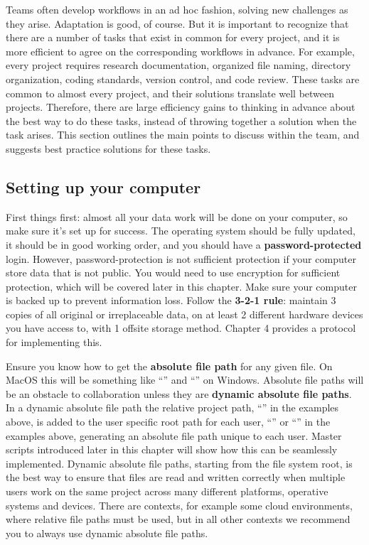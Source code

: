 Teams often develop workflows in an ad hoc fashion,
solving new challenges as they arise.
Adaptation is good, of course.
But it is important to recognize
that there are a number of tasks that exist in common for every project,
and it is more efficient to agree on the corresponding workflows in advance.
For example, every project requires
research documentation, organized file naming, directory organization,
coding standards, version control, and code review.
These tasks are common to almost every project,
and their solutions translate well between projects.
Therefore, there are large efficiency gains to
thinking in advance about the best way to do these tasks,
instead of throwing together a solution when the task arises.
This section outlines the main points to discuss within the team,
and suggests best practice solutions for these tasks.

\subsection{Setting up your computer}

First things first:
almost all your data work will be done on your computer,
so make sure it's set up for success.
The operating system should be fully updated,
it should be in good working order,
and you should have a \textbf{password-protected} login.
However, password-protection is not sufficient protection 
if your computer store data that is not public.
You would need to use encryption for sufficient protection,
which will be covered later in this chapter.
Make sure your computer is backed up to prevent information loss.
Follow the \textbf{3-2-1 rule}: maintain 3 copies of all original or irreplaceable data,
on at least 2 different hardware devices you have access to,
with 1 offsite storage method.
Chapter 4 provides a protocol for implementing this.

Ensure you know how to get the \textbf{absolute file path} for any given file.
On MacOS this will be something like ``''
and ``'' on Windows.
Absolute file paths will be an obstacle to collaboration
unless they are \textbf{dynamic absolute file paths}.
In a dynamic absolute file path the relative project path,
``'' in the examples above, is added
to the user specific root path for each user,
``'' or ``'' in the examples above,
generating an absolute file path unique to each user.
Master scripts introduced later in this chapter will show
how this can be seamlessly implemented.
Dynamic absolute file paths, starting from the file system root,
is the best way to ensure that files are read and written correctly
when multiple users work on the same project
across many different platforms, operative systems and devices.
There are contexts, for example some cloud environments,
where relative file paths must be used,
but in all other contexts we recommend you
to always use dynamic absolute file paths.

